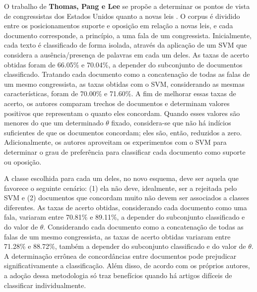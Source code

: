 O trabalho de \textbf{Thomas, Pang e Lee} se propõe a determinar os pontos de vista de congressistas dos Estados Unidos quanto a novas leis \cite{get-out-the-vote}. O corpus é dividido entre os posicionamentos suporte e oposição em relação a novas leis, e cada documento corresponde, a princípio, a uma fala de um congressista. Inicialmente, cada texto é classificado de forma isolada, através da aplicação de um SVM que considera a ausência/presença de palavras em cada um deles. As taxas de acerto obtidas foram de 66.05\% e 70.04\%, a depender do subconjunto de documentos classificado. Tratando cada documento como a concatenação de todas as falas de um mesmo congressista, as taxas obtidas com o SVM, considerando as mesmas características, foram de 70.00\% e 71.60\%. A fim de melhorar essas taxas de acerto, os autores comparam trechos de documentos e determinam valores positivos que representam o quanto eles concordam. Quando esses valores são menores do que um determinado \ensuremath{\theta} fixado, considera-se que não há indícios suficientes de que os documentos concordam; eles são, então, reduzidos a zero. Adicionalmente, os autores aproveitam os experimentos com o SVM para determinar o grau de preferência para classificar cada documento como suporte ou oposição. 

A classe escolhida para cada um deles, no novo esquema, deve ser aquela que favorece o seguinte cenário: (1) ela não deve, idealmente, ser a rejeitada pelo SVM e (2) documentos que concordam muito não devem ser associados a classes diferentes. As taxas de acerto obtidas, considerando cada documento como uma fala, variaram entre 70.81\% e 89.11\%, a depender do subconjunto classificado e do valor de \ensuremath{\theta}. Considerando cada documento como a concatenação de todas as falas de um mesmo congressista, as taxas de acerto obtidas variaram entre 71.28\% e 88.72\%, também a depender do subconjunto classificado e do valor de \ensuremath{\theta}. A determinação errônea de concordâncias entre documentos pode prejudicar significativamente a classificação. Além disso, de acordo com os próprios autores, a adoção dessa metodologia só traz benefícios quando há artigos difíceis de classificar individualmente.    

